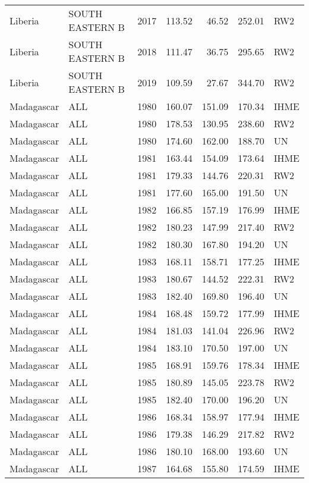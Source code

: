 \begin{longtable}{lllrrrl}
  Liberia & SOUTH EASTERN B & 2017 & 113.52 & 46.52 & 252.01 & RW2 \\ 
  Liberia & SOUTH EASTERN B & 2018 & 111.47 & 36.75 & 295.65 & RW2 \\ 
  Liberia & SOUTH EASTERN B & 2019 & 109.59 & 27.67 & 344.70 & RW2 \\ 
  Madagascar & ALL & 1980 & 160.07 & 151.09 & 170.34 & IHME \\ 
  Madagascar & ALL & 1980 & 178.53 & 130.95 & 238.60 & RW2 \\ 
  Madagascar & ALL & 1980 & 174.60 & 162.00 & 188.70 & UN \\ 
  Madagascar & ALL & 1981 & 163.44 & 154.09 & 173.64 & IHME \\ 
  Madagascar & ALL & 1981 & 179.33 & 144.76 & 220.31 & RW2 \\ 
  Madagascar & ALL & 1981 & 177.60 & 165.00 & 191.50 & UN \\ 
  Madagascar & ALL & 1982 & 166.85 & 157.19 & 176.99 & IHME \\ 
  Madagascar & ALL & 1982 & 180.23 & 147.99 & 217.40 & RW2 \\ 
  Madagascar & ALL & 1982 & 180.30 & 167.80 & 194.20 & UN \\ 
  Madagascar & ALL & 1983 & 168.11 & 158.71 & 177.25 & IHME \\ 
  Madagascar & ALL & 1983 & 180.67 & 144.52 & 222.31 & RW2 \\ 
  Madagascar & ALL & 1983 & 182.40 & 169.80 & 196.40 & UN \\ 
  Madagascar & ALL & 1984 & 168.48 & 159.72 & 177.99 & IHME \\ 
  Madagascar & ALL & 1984 & 181.03 & 141.04 & 226.96 & RW2 \\ 
  Madagascar & ALL & 1984 & 183.10 & 170.50 & 197.00 & UN \\ 
  Madagascar & ALL & 1985 & 168.91 & 159.76 & 178.34 & IHME \\ 
  Madagascar & ALL & 1985 & 180.89 & 145.05 & 223.78 & RW2 \\ 
  Madagascar & ALL & 1985 & 182.40 & 170.00 & 196.20 & UN \\ 
  Madagascar & ALL & 1986 & 168.34 & 158.97 & 177.94 & IHME \\ 
  Madagascar & ALL & 1986 & 179.38 & 146.29 & 217.82 & RW2 \\ 
  Madagascar & ALL & 1986 & 180.10 & 168.00 & 193.60 & UN \\ 
  Madagascar & ALL & 1987 & 164.68 & 155.80 & 174.59 & IHME \\ 

\end{longtable}

